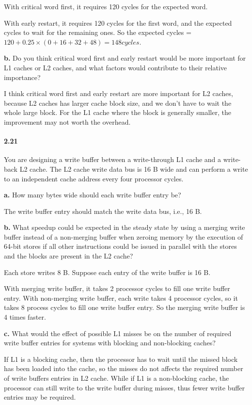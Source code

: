 \documentclass{article}
\begin{document}
With critical word first, it requires 120 cycles for the expected word.

With early restart, it requires 120 cycles for the first word, and the expected cycles to wait for the remaining ones. So the expected cycles = $120 + 0.25\times(0 + 16 + 32 + 48) = 148 cycles$.

\textbf{b.} Do you think critical word first and early restart would be more important for L1 caches or L2 caches, and what factors would contribute to their relative importance?

I think critical word first and early restart are more important for L2 caches, because L2 caches has larger cache block size, and we don't have to wait the whole large block. For the L1 cache where the block is generally smaller, the improvement may not worth the overhead.

\paragraph{2.21} You are designing a write buffer between a write-through L1 cache and a write-back L2 cache. The L2 cache write data bus is 16 B wide and can perform a write to an independent cache address every four processor cycles.

\textbf{a.} How many bytes wide should each write buffer entry be?

The write buffer entry should match the write data bus, i.e., 16 B.

\textbf{b.} What speedup could be expected in the steady state by using a merging write buffer instead of a non-merging buffer when zeroing memory by the execution of 64-bit stores if all other instructions could be issued in parallel with the stores and the blocks are present in the L2 cache?

Each store writes 8 B. Suppose each entry of the write buffer is 16 B.

With merging write buffer, it takes 2 processor cycles to fill one write buffer entry. With non-merging write buffer, each write takes 4 processor cycles, so it takes 8 process cycles to fill one write buffer entry. So the merging write buffer is 4 times faster.

\textbf{c.} What would the effect of possible L1 misses be on the number of required write buffer entries for systems with blocking and non-blocking caches?

If L1 is a blocking cache, then the processor has to wait until the missed block has been loaded into the cache, so the misses do not affects the required number of write buffers entries in L2 cache. While if L1 is a non-blocking cache, the processor can still write to the write buffer during misses, thus fewer write buffer entries may be required.
\end{document}
